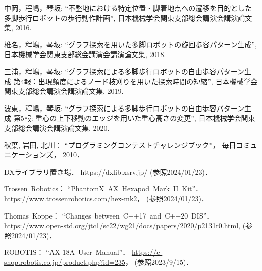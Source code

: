 \begin{thebibliography}{99}
    中岡，程嶋，琴坂: 
    ``不整地における特定位置・脚着地点への遷移を目的とした多脚歩行ロボットの歩行動作計画'',
    日本機械学会関東支部総会講演会講演論文集,
    2016.

    椎名，程嶋，琴坂: 
    ``グラフ探索を用いた多脚ロボットの旋回歩容パターン生成'',
    日本機械学会関東支部総会講演会講演論文集,
    2018.

    三浦，程嶋，琴坂: 
    ``グラフ探索による多脚歩行ロボットの自由歩容パターン生成 第4報：出現頻度によるノード枝刈りを用いた探索時間の短縮'',
    日本機械学会関東支部総会講演会講演論文集,
    2019.

    波東，程嶋，琴坂: 
    ``グラフ探索による多脚歩行ロボットの自由歩容パターン生成 第5報: 重心の上下移動のエッジを用いた重心高さの変更'',
    日本機械学会関東支部総会講演会講演論文集,
    2020.

    秋葉, 岩田, 北川：
    ``プログラミングコンテストチャレンジブック''，
    毎日コミュニケーションズ，
    2010．
    
    DXライブラリ置き場．
    https://dxlib.xsrv.jp/ (参照2024/01/23)．

    Trossen~Robotics：
    ``PhantomX~AX~Hexapod~Mark~II~Kit''．
    \url{https://www.trossenrobotics.com/hex-mk2}，
    (参照2024/01/23)．

    Thomas~Koppe：
    ``Changes~between~C++17~and~C++20~DIS''．
    \url{https://www.open-std.org/jtc1/sc22/wg21/docs/papers/2020/p2131r0.html}, 
    (参照2024/01/23)．

    ROBOTIS：
    ``AX-18A~User~Manual''．
    \url{https://e-shop.robotis.co.jp/product.php?id=235}，
    (参照2023/9/15)．

\end{thebibliography}
\endinput